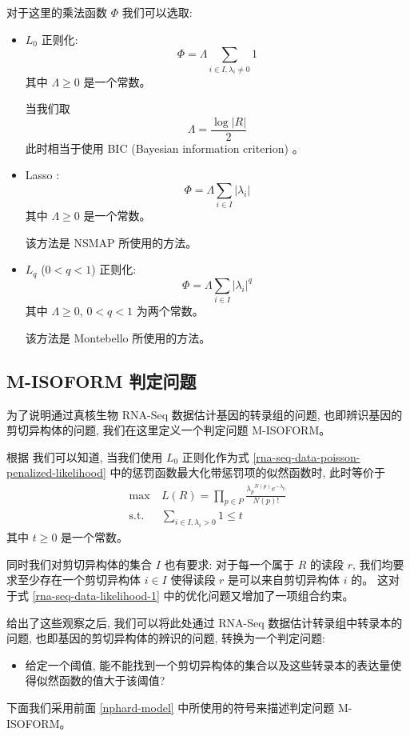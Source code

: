 对于这里的乘法函数 $\Phi$ 我们可以选取: 
\begin{itemize}
\item $L_0$ 正则化:
\[
\Phi = \Lambda \sum_{i \in I, \lambda_i \neq 0} 1
\]
其中 $\Lambda \geq 0$ 是一个常数。 

当我们取 
\[
\Lambda = \frac{\log |R|}{2}
\]
此时相当于使用 BIC (Bayesian information criterion) \cite{BIC.Schwarz_1978}。 

\item Lasso \cite{tibshirani1996regression}:
\[
\Phi = \Lambda \sum_{i \in I} |\lambda_i|
\]
其中 $\Lambda \geq 0$ 是一个常数。 

该方法是 NSMAP \cite{nsmap.21575225} 所使用的方法。 

\item $L_q$ ($0<q<1$) 正则化:
\[
\Phi = \Lambda \sum_{i \in I} |\lambda_i|^q
\]
其中 $\Lambda \geq 0$, $0 <q<1$ 为两个常数。 

该方法是 Montebello \cite{Hiller.Montebello} 所使用的方法。 
\end{itemize}

\subsection{M-ISOFORM 判定问题}
为了说明通过真核生物 RNA-Seq 数据估计基因的转录组的问题, 
也即辨识基因的剪切异构体的问题, 我们在这里定义一个判定问题 M-ISOFORM。 

根据  我们可以知道, 
当我们使用 $L_0$ 正则化作为式 \eqref{rna-seq-data-poisson-penalized-likelihood} 
中的惩罚函数最大化带惩罚项的似然函数时, 此时等价于
\begin{align}
\max &\ L(R) =  \prod_{p\in P} \frac{{\lambda_p}^{N(p)} e^{-\lambda_p}}{N(p)!} \nonumber \\
\label{rna-seq-data-likelihood-1}
\text{s.t.} &\  \sum_{i \in I, \lambda_i>0} 1 \leq t
\end{align}
其中 $t\geq 0$ 是一个常数。 


同时我们对剪切异构体的集合 $I$ 也有要求: 对于每一个属于 $R$ 的读段 $r$, 
我们均要求至少存在一个剪切异构体 $i \in I$ 使得读段 $r$ 是可以来自剪切异构体 $i$ 的。 
这对于式 \ref{rna-seq-data-likelihood-1} 中的优化问题又增加了一项组合约束。 

给出了这些观察之后, 我们可以将此处通过 RNA-Seq 数据估计转录组中转录本的问题, 
也即基因的剪切异构体的辨识的问题, 转换为一个判定问题:
\begin{itemize}
\item 给定一个阈值, 
能不能找到一个剪切异构体的集合以及这些转录本的表达量使得似然函数的值大于该阈值?
\end{itemize}
下面我们采用前面 \ref{nphard-model} 中所使用的符号来描述判定问题 M-ISOFORM。 

